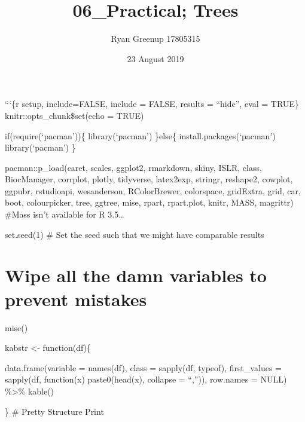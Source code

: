 \documentclass[
]{article}
\title{06\_Practical; Trees}
\author{Ryan Greenup 17805315}
\date{23 August 2019}
\begin{document}
\maketitle

```\{r setup, include=FALSE, include = FALSE, results = ``hide'', eval =
TRUE\} knitr::opts\_chunk\$set(echo = TRUE)

if(require(`pacman'))\{ library(`pacman') \}else\{
install.packages(`pacman') library(`pacman') \}

pacman::p\_load(caret, scales, ggplot2, rmarkdown, shiny, ISLR, class,
BiocManager, corrplot, plotly, tidyverse, latex2exp, stringr, reshape2,
cowplot, ggpubr, rstudioapi, wesanderson, RColorBrewer, colorspace,
gridExtra, grid, car, boot, colourpicker, tree, ggtree, mise, rpart,
rpart.plot, knitr, MASS, magrittr) \#Mass isn't available for R
3.5\ldots{}

set.seed(1) \# Set the seed such that we might have comparable results

\hypertarget{wipe-all-the-damn-variables-to-prevent-mistakes}{%
\section{Wipe all the damn variables to prevent
mistakes}\label{wipe-all-the-damn-variables-to-prevent-mistakes}}

mise()

kabstr \textless- function(df)\{

data.frame(variable = names(df), class = sapply(df, typeof),
first\_values = sapply(df, function(x) paste0(head(x), collapse =
``,'')), row.names = NULL) \%\textgreater\% kable()

\} \# Pretty Structure Print
\end{document}
